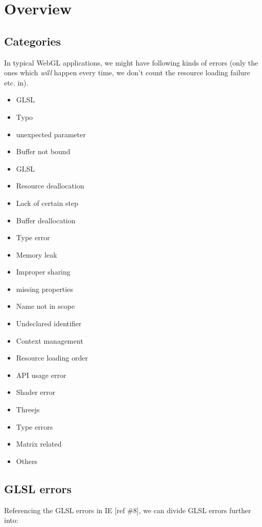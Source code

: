 \section{Overview}\label{overview}

\subsection{Categories}\label{categories}

In typical WebGL applications, we might have following kinds of errors
(only the ones which \emph{will} happen every time, we don't count the
resource loading failure etc. in).

\begin{itemize}
\tightlist
\item
  GLSL
\item
  Typo
\item
  unexpected parameter
\item
  Buffer not bound
\item
  GLSL
\item
  Resource deallocation
\item
  Lack of certain step
\item
  Buffer deallocation
\item
  Type error
\item
  Memory leak
\item
  Improper sharing
\item
  missing properties
\item
  Name not in scope
\item
  Undeclared identifier
\item
  Context management
\item
  Resource loading order
\item
  API usage error
\item
  Shader error
\item
  Threejs
\item
  Type errors
\item
  Matrix related
\item
  Others
\end{itemize}

\subsection{GLSL errors}\label{glsl-errors}

Referencing the GLSL errors in IE {[}ref \#8{]}, we can divide GLSL
errors further into:

